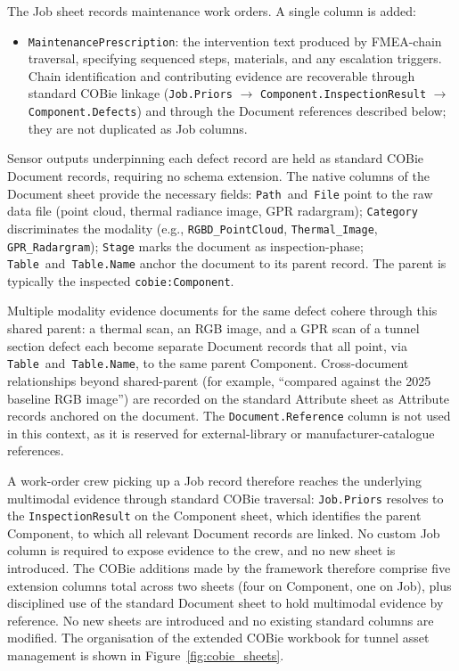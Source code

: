 \documentclass[11pt,a4paper]{article}
\begin{document}
The Job sheet records maintenance work orders. A single column is added:
\begin{itemize}[leftmargin=*, itemsep=0.3em]
  \item \texttt{MaintenancePrescription}: the intervention text produced by FMEA-chain traversal, specifying sequenced steps, materials, and any escalation triggers. Chain identification and contributing evidence are recoverable through standard COBie linkage (\texttt{Job.Priors} $\to$ \texttt{Component.InspectionResult} $\to$ \texttt{Component.Defects}) and through the Document references described below; they are not duplicated as Job columns.
\end{itemize}

Sensor outputs underpinning each defect record are held as standard COBie Document records, requiring no schema extension. The native columns of the Document sheet provide the necessary fields: \texttt{Path}~and~\texttt{File} point to the raw data file (point cloud, thermal radiance image, GPR radargram); \texttt{Category} discriminates the modality (e.g., \texttt{RGBD\_PointCloud}, \texttt{Thermal\_Image}, \texttt{GPR\_Radargram}); \texttt{Stage} marks the document as inspection-phase; \texttt{Table}~and~\texttt{Table.Name} anchor the document to its parent record. The parent is typically the inspected \texttt{cobie:Component}. 

Multiple modality evidence documents for the same defect cohere through this shared parent: a thermal scan, an RGB image, and a GPR scan of a tunnel section defect each become separate Document records that all point, via \texttt{Table}~and~\texttt{Table.Name}, to the same parent Component. Cross-document relationships beyond shared-parent (for example, ``compared against the 2025 baseline RGB image'') are recorded on the standard Attribute sheet as Attribute records anchored on the document. The \texttt{Document.Reference} column is not used in this context, as it is reserved for external-library or manufacturer-catalogue references.

A work-order crew picking up a Job record therefore reaches the underlying multimodal evidence through standard COBie traversal: \texttt{Job.Priors} resolves to the \texttt{InspectionResult} on the Component sheet, which identifies the parent Component, to which all relevant Document records are linked. No custom Job column is required to expose evidence to the crew, and no new sheet is introduced. The COBie additions made by the framework therefore comprise five extension columns total across two sheets (four on Component, one on Job), plus disciplined use of the standard Document sheet to hold multimodal evidence by reference. No new sheets are introduced and no existing standard columns are modified. The organisation of the extended COBie workbook for tunnel asset management is shown in Figure~\ref{fig:cobie_sheets}.
\end{document}
